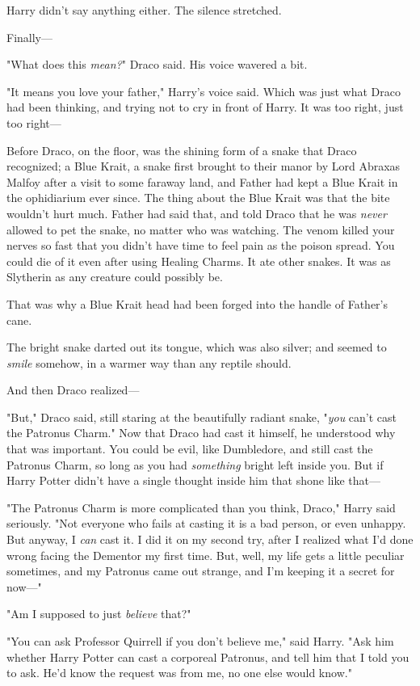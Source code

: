 Harry didn't say anything either. The silence stretched.

Finally---

"What does this \emph{mean?}" Draco said. His voice wavered a bit.

"It means you love your father," Harry's voice said. Which was just what Draco 
had been thinking, and trying not to cry in front of Harry. It was too right, 
just too right---

Before Draco, on the floor, was the shining form of a snake that Draco 
recognized; a Blue Krait, a snake first brought to their manor by Lord Abraxas 
Malfoy after a visit to some faraway land, and Father had kept a Blue Krait in 
the ophidiarium ever since. The thing about the Blue Krait was that the bite 
wouldn't hurt much. Father had said that, and told Draco that he was 
\emph{never} allowed to pet the snake, no matter who was watching. The venom 
killed your nerves so fast that you didn't have time to feel pain as the poison 
spread. You could die of it even after using Healing Charms. It ate other 
snakes. It was as Slytherin as any creature could possibly be.

That was why a Blue Krait head had been forged into the handle of Father's cane.

The bright snake darted out its tongue, which was also silver; and seemed to 
\emph{smile} somehow, in a warmer way than any reptile should.

And then Draco realized---

"But," Draco said, still staring at the beautifully radiant snake, "\emph{you} 
can't cast the Patronus Charm." Now that Draco had cast it himself, he 
understood why that was important. You could be evil, like Dumbledore, and 
still cast the Patronus Charm, so long as you had \emph{something} bright left 
inside you. But if Harry Potter didn't have a single thought inside him that 
shone like that---

"The Patronus Charm is more complicated than you think, Draco," Harry said 
seriously. "Not everyone who fails at casting it is a bad person, or even 
unhappy. But anyway, I \emph{can} cast it. I did it on my second try, after I 
realized what I'd done wrong facing the Dementor my first time. But, well, my 
life gets a little peculiar sometimes, and my Patronus came out strange, and 
I'm keeping it a secret for now---"

"Am I supposed to just \emph{believe} that?"

"You can ask Professor Quirrell if you don't believe me," said Harry. "Ask him 
whether Harry Potter can cast a corporeal Patronus, and tell him that I told 
you to ask. He'd know the request was from me, no one else would know."

